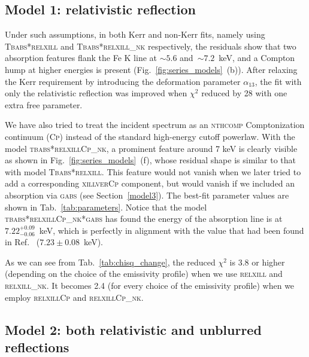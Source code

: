 \documentclass[11pt,a4paper,pdftex]{article}
\begin{document}
\subsection{Model 1: relativistic reflection}\label{model1}

Under such assumptions, in both Kerr and non-Kerr fits, namely using \textsc{Tbabs*relxill} and \textsc{Tbabs*relxill\_nk} respectively, the residuals show that two absorption features flank the Fe K line at $\sim5.6$ and~$\sim7.2$~keV, and a Compton hump at higher energies is present (Fig.~\ref{fig:series_models}~(b)). After relaxing the Kerr requirement by introducing the deformation parameter $\alpha_{13}$, the fit with only the relativistic reflection was improved when $\chi^2$ reduced by 28 with one extra free parameter. 


We have also tried to treat the incident spectrum as an \textsc{nthcomp} Comptonization continuum (\textsc{Cp}) instead of the standard high-energy cutoff powerlaw. With the model \textsc{tbabs*relxillCp\_nk}, a prominent feature around 7 keV is clearly visible as shown in Fig.~\ref{fig:series_models}~(f), whose residual shape is similar to that with model \textsc{Tbabs*relxill}. This feature would not vanish when we later tried to add a corresponding \textsc{xillverCp} component, but would vanish if we included an absorption via \textsc{gabs} (see Section~\ref{model3}). The best-fit parameter values are shown in Tab.~\ref{tab:parameters}. Notice that the model \textsc{tbabs*relxillCp\_nk*gabs} has found the energy of the absorption line is at $7.22^{+0.09}_{-0.06}$~keV, which is perfectly in alignment with the value that had been found in Ref.~\cite{javier_gx339} ($7.23\pm0.08$~keV). 


As we can see from Tab.~\ref{tab:chisq_change}, the reduced $\chi^2$ is 3.8 or higher (depending on the choice of the emissivity profile) when we use \textsc{relxill} and \textsc{relxill\_nk}. It becomes 2.4 (for every choice of the emissivity profile) when we employ \textsc{relxillCp} and \textsc{relxillCp\_nk}.



\subsection{Model 2: both relativistic and unblurred reflections}\label{model2}
\end{document}
